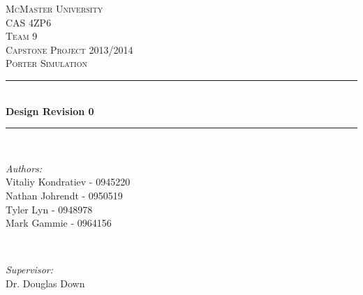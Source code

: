 \documentclass[paper=letter, fontsize=10pt]{scrartcl}
\numberwithin{equation}{section}		%
\numberwithin{figure}{section}			%
\numberwithin{table}{section}				%
\begin{document}
\begin{titlepage}

\newcommand{\HRule}{\rule{\linewidth}{0.5mm}} %
\newcommand{\authors}{\shortstack{Vitaliy Kondratiev,\\Nathan Johrendt,\\Tyler Lyn,\\Mark Gammie}}

\begin{center}
 

\textsc{\LARGE McMaster University}\\[1.5cm] %
\textsc{\Large CAS 4ZP6}\\[0.5cm]
\textsc{\Large Team 9} \\[0.5cm]
\textsc{\Large Capstone Project 2013/2014}\\[0.5cm] %
\textsc{\large Porter Simulation}\\[0.5cm] %


\HRule \\[0.4cm]
{ \huge \bfseries Design Revision 0}\\[0.4cm] %
\HRule \\[1.5cm]
 

\begin{minipage}{0.4\textwidth}
\begin{flushleft} \large
\emph{Authors:}\\
Vitaliy Kondratiev - 0945220\\
Nathan Johrendt - 0950519\\
Tyler Lyn - 0948978\\
Mark Gammie - 0964156\\
\end{flushleft}
\end{minipage}
~
\begin{minipage}{0.4\textwidth}
\begin{flushright} \large
\emph{Supervisor:} \\
Dr. Douglas Down %
\end{flushright}
\end{minipage}\\[4cm]


\end{center}
\end{titlepage}
\end{document}
